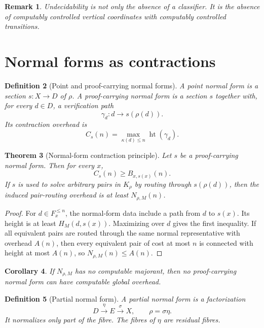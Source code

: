 \documentclass[11pt]{article}
\newtheorem{theorem}{Theorem}[section]
\newtheorem{corollary}[theorem]{Corollary}
\newtheorem{definition}[theorem]{Definition}
\newtheorem{remark}[theorem]{Remark}
\begin{document}
\begin{remark}
Undecidability is not only the absence of a classifier.  It is the absence of computably controlled vertical coordinates with computably controlled transitions.
\end{remark}

\section{Normal forms as contractions}

\begin{definition}[Point and proof-carrying normal forms]
A point normal form is a section \(s:X\to D\) of \(\rho\).  A proof-carrying normal form is a section \(s\) together with, for every \(d\in D\), a verification path
\[
\gamma_d:d\to s(\rho(d)).
\]
Its contraction overhead is
\[
C_s(n)=\max_{\kappa(d)\le n}\operatorname{ht}(\gamma_d).
\]
\end{definition}

\begin{theorem}[Normal-form contraction principle]
Let \(s\) be a proof-carrying normal form.  Then for every \(x\),
\[
C_s(n)\ge B_{x,s(x)}(n).
\]
If \(s\) is used to solve arbitrary pairs in \(K_\rho\) by routing through \(s(\rho(d))\), then the induced pair-routing overhead is at least \(N_{\rho,M}(n)\).
\end{theorem}

\begin{proof}
For \(d\in F_x^{\le n}\), the normal-form data include a path from \(d\) to \(s(x)\).  Its height is at least \(H_M(d,s(x))\).  Maximizing over \(d\) gives the first inequality.  If all equivalent pairs are routed through the same normal representative with overhead \(A(n)\), then every equivalent pair of cost at most \(n\) is connected with height at most \(A(n)\), so \(N_{\rho,M}(n)\le A(n)\).
\end{proof}

\begin{corollary}
If \(N_{\rho,M}\) has no computable majorant, then no proof-carrying normal form can have computable global overhead.
\end{corollary}

\begin{definition}[Partial normal form]
A partial normal form is a factorization
\[
D\xrightarrow{\eta}E\xrightarrow{\sigma}X,\qquad \rho=\sigma\eta.
\]
It normalizes only part of the fibre.  The fibres of \(\eta\) are residual fibres.
\end{definition}
\end{document}
